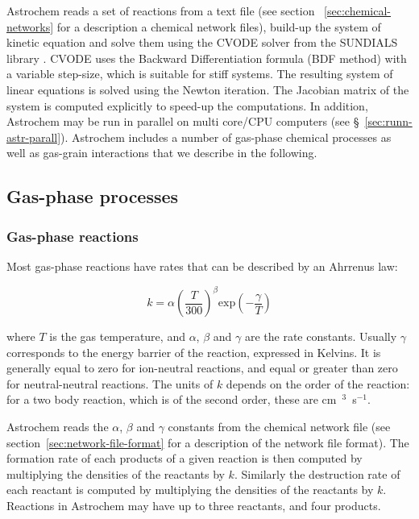 \documentclass[a4paper,12pt]{article}
\begin{document}
 Astrochem reads a set of reactions from a text file (see section~
 \ref{sec:chemical-networks} for a description a chemical network
 files), build-up the system of kinetic equation and solve them using
 the CVODE solver \citep{Cohen96} from the SUNDIALS library
 \citep{Hindmarsh05}. CVODE uses the Backward Differentiation formula
 (BDF method) with a variable step-size, which is suitable for stiff
 systems. The resulting system of linear equations is solved using the
 Newton iteration. The Jacobian matrix of the system is computed
 explicitly to speed-up the computations. In addition, Astrochem may
 be run in parallel on multi core/CPU computers (see
 \S~\ref{sec:runn-astr-parall}). Astrochem includes a number of
 gas-phase chemical processes as well as gas-grain interactions that
 we describe in the following.

\subsection{Gas-phase processes}
\label{sec:gas-phase-processes}
 
\subsubsection{Gas-phase reactions}
\label{sec:gas-phase-reactions}

Most gas-phase reactions have rates that can be described by an
Ahrrenus law:

\begin{equation}
  k = \alpha  \left( \frac{T}{300} \right)^\beta  \mathrm{exp} \left(
    -\frac{\gamma}{T} \right)
  \label{eq:arrhenius}
\end{equation}

\noindent
where $T$ is the gas temperature, and $\alpha$, $\beta$ and $\gamma$
are the rate constants. Usually $\gamma$ corresponds to the energy
barrier of the reaction, expressed in Kelvins. It is generally equal
to zero for ion-neutral reactions, and equal or greater than zero for
neutral-neutral reactions. The units of $k$ depends on the order of
the reaction: for a two body reaction, which is of the second order,
these are cm~$^{3}$~s$^{-1}$.

Astrochem reads the $\alpha$, $\beta$ and $\gamma$ constants from the
chemical network file (see section~\ref{sec:network-file-format} for a
description of the network file format). The formation rate of each
products of a given reaction is then computed by multiplying the
densities of the reactants by $k$. Similarly the destruction rate of
each reactant is computed by multiplying the densities of the
reactants by $k$. Reactions in Astrochem may have up to three
reactants, and four products.
\end{document}
